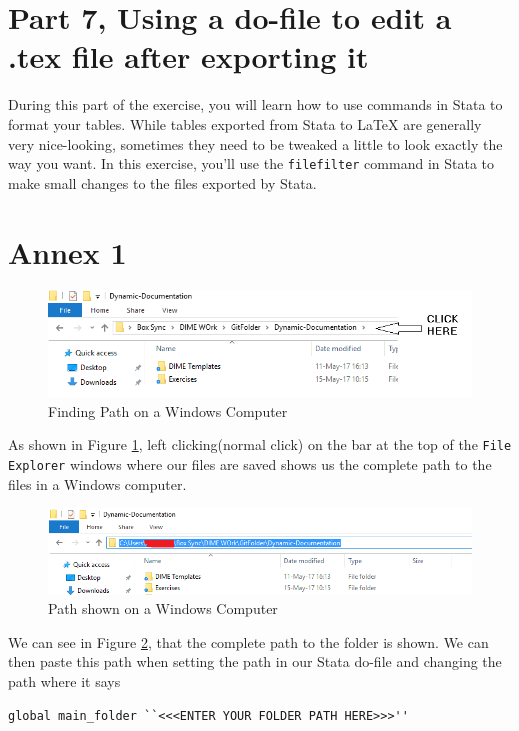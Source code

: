 \documentclass[]{article}
\begin{document}
\section*{Part 7, Using a do-file to edit a .tex file after exporting it}
During this part of the exercise, you will learn how to use commands in Stata to format your tables. While tables exported from Stata to {\LaTeX} are generally very nice-looking, sometimes they need to be tweaked a little to look exactly the way you want. In this exercise, you'll use the \texttt{filefilter} command in Stata to make small changes to the files exported by Stata. 

\newpage
\section*{Annex 1} {\label{annex1}}

\begin{figure}[H]
	\centering
	\includegraphics[width=1\linewidth]{img/pathwin}
	\caption{Finding Path on a Windows Computer}
	\label{fig:pathwin}
\end{figure}
As shown in Figure \ref{fig:pathwin}, left clicking(normal click) on the bar at the top of the \texttt{File Explorer} windows where our files are saved shows us the complete path to the files in a Windows computer. \\

\begin{figure}[H]
	\centering
	\includegraphics[width=1\linewidth]{img/pathwin2}
	\caption{Path shown on a Windows Computer}
	\label{fig:pathwin2}
\end{figure}

We can see in Figure \ref{fig:pathwin2}, that the complete path to the folder is shown. We can then paste this path when setting the path in our Stata do-file and changing the path where it says \begin{verbatim}
global main_folder ``<<<ENTER YOUR FOLDER PATH HERE>>>''
\end{verbatim} 
	
\end{document}
